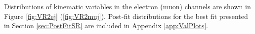 Distributions of kinematic variables in the electron (muon) channels are shown in Figure \ref{fig:VR2ej} (\ref{fig:VR2muj}).  Post-fit distributions for the best fit presented in Section \ref{sec:PostFitSR} are included in Appendix \ref{app:ValPlots}.

